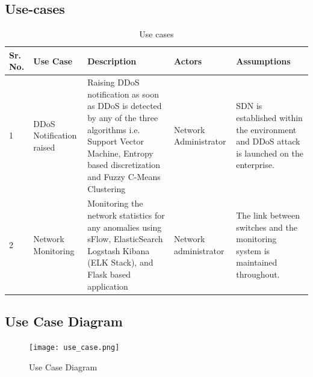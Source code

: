 \documentclass[12pt,a4paper,final]{report}
\begin{document}
\subsection{Use-cases}
\begin{table}[h]
\begin{center}
\begin{tabular}{|p{1cm}|p{3cm}|p{4cm}|p{3.5cm}|p{4cm}|}
\hline 
\textbf{Sr. No.} & \textbf{Use Case} & \textbf{Description} & \textbf{Actors} & \textbf{Assumptions} \\ 
\hline 
1 & DDoS Notification raised & Raising DDoS notification as soon as DDoS is detected by any of the three algorithms i.e. Support Vector Machine, Entropy based discretization and Fuzzy C-Means Clustering & Network Administrator & SDN is established within the environment and DDoS attack is launched on the enterprise. \\
\hline
2 & Network Monitoring & Monitoring the network statistics for any anomalies using sFlow, ElasticSearch Logstash Kibana (ELK Stack), and Flask based application & Network administrator & The link between switches and the monitoring system is maintained throughout. \\
\hline 
\end{tabular} 
\end{center}
\caption{Use cases}
\end{table}

\subsection{Use Case Diagram}
\begin{figure}[h]
\begin{center}
\texttt{[image: use\_case.png]}
\caption{Use Case Diagram}
\end{center}
\end{figure}

\newpage
\end{document}
